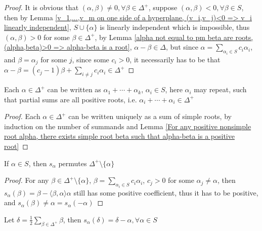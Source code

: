\documentclass[main]{subfiles}
\begin{document}
\begin{proof}
It is obvious that $(\alpha,\beta)\neq0,\forall\beta\in\Delta^+$, suppose $(\alpha,\beta)<0,\forall\beta\in S$, then by Lemma \ref{v_1,...,v_m on one side of a hyperplane, (v_i,v_j)<0 => v_i linearly independent}, $S\cup\{\alpha\}$ is linearly independent which is impossible, thus $(\alpha,\beta)>0$ for some $\beta\in\Delta^+$, by Lemma \ref{alpha not equal to pm beta are roots, (alpha,beta)>0 => alpha-beta is a root}, $\alpha-\beta\in\Delta$, but since $\displaystyle\alpha=\sum_{\alpha_i\in S}c_i\alpha_i$, and $\beta=\alpha_j$ for some $j$, since some $c_i>0$, it necessarily has to be that $\displaystyle\alpha-\beta=(c_j-1)\beta+\sum_{i\neq j}c_i\alpha_i\in\Delta^+$
\end{proof}

\begin{lemma}
Each $\alpha\in\Delta^+$ can be written as $\alpha_1+\cdots+\alpha_k$, $\alpha_i\in S$, here $\alpha_i$ may repeat, such that partial sums are all positive roots, i.e. $\alpha_i+\cdots+\alpha_i\in\Delta^+$
\end{lemma}

\begin{proof}
Each $\alpha\in\Delta^+$ can be written uniquely as a sum of simple roots, by induction on the number of summands and Lemma \ref{For any positive nonsimple root alpha, there exists simple root beta such that alpha-beta is a positive root}
\end{proof}

\begin{lemma}\label{If alpha is a simple root, then s_alpha permutes postive roots except alpha}
If $\alpha\in S$, then $s_\alpha$ permutes $\Delta^+\setminus\{\alpha\}$
\end{lemma}

\begin{proof}
For any $\beta\in\Delta^+\setminus\{\alpha\}$, $\displaystyle\beta=\sum_{\alpha_i\in S}c_i\alpha_i$, $c_j>0$ for some $\alpha_j\neq\alpha$, then $s_\alpha(\beta)=\beta-\langle\beta,\alpha\rangle\alpha$ still has some positive coefficient, thus it has to be positive, and $s_\alpha(\beta)\neq\alpha=s_\alpha(-\alpha)$
\end{proof}

\begin{corollary}\label{delta=half of sum of positive roots, then for any simple root alpha, s_alpha(delta)=delta-alpha}
Let $\delta=\displaystyle\frac{1}{2}\sum_{\beta\in\Delta^+}\beta$, then $s_\alpha(\delta)=\delta-\alpha,\forall\alpha\in S$
\end{corollary}
\end{document}
